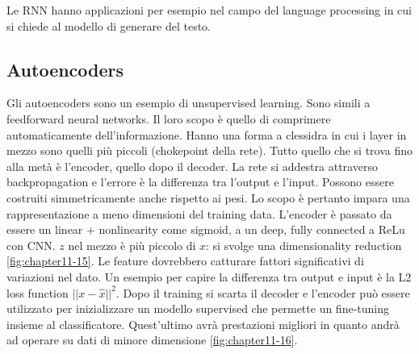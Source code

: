 	Le RNN hanno applicazioni per esempio nel campo del language processing in cui si chiede al modello di generare del testo.

	\subsection{Autoencoders}
	Gli autoencoders sono un esempio di unsupervised learning.
	Sono simili a feedforward neural networks.
	Il loro scopo \`e quello di comprimere automaticamente dell'informazione.
	Hanno una forma a clessidra in cui i layer in mezzo sono quelli pi\`u piccoli (chokepoint della rete).
	Tutto quello che si trova fino alla met\`a \`e l'encoder, quello dopo il decoder.
	La rete si addestra attraverso backpropagation e l'errore \`e la differenza tra l'output e l'input.
	Possono essere costruiti simmetricamente anche rispetto ai pesi.
	Lo scopo \`e pertanto impara una rappresentazione a meno dimensioni del training data.
	L'encoder \`e passato da essere un linear + nonlinearity come sigmoid, a un deep, fully connected a ReLu con CNN.
	$z$ nel mezzo \`e pi\`u piccolo di $x$: si svolge una dimensionality reduction \ref{fig:chapter11-15}.
	Le feature dovrebbero catturare fattori significativi di variazioni nel dato.
	Un esempio per capire la differenza tra output e input \`e la L2 loss function $||x-\hat{x}||^2$.
	Dopo il training si scarta il decoder e l'encoder pu\`o essere utilizzato per inizializzare un modello supervised che permette un fine-tuning insieme al classificatore. Quest'ultimo avr\`a prestazioni migliori in quanto andr\`a ad operare su dati di minore dimensione \ref{fig:chapter11-16}. 

